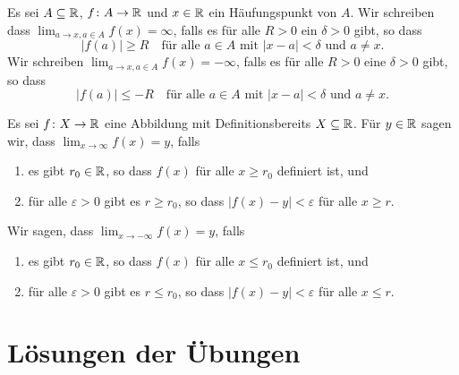 \documentclass[a4paper,10pt]{article}
\begin{document}
\begin{defi}
 Es sei $A \subseteq \mathbb{R}$, $f \colon A \to \mathbb{R}$ und $x \in \mathbb{R}$ ein Häufungspunkt von $A$. Wir schreiben dass $\lim_{a \to x, a \in A} f(x) = \infty$, falls es für alle $R > 0$ ein $\delta > 0$ gibt, so dass
 \[
  |f(a)| \geq R \quad \text{für alle $a \in A$ mit $|x-a| < \delta$ und $a \neq x$}.
 \]
 Wir schreiben $\lim_{a \to x, a \in A} f(x) = -\infty$, falls es für alle $R > 0$ eine $\delta > 0$ gibt, so dass
 \[
  |f(a)| \leq -R \quad \text{für alle $a \in A$ mit $|x-a| < \delta$ und $a \neq x$}.
 \]
\end{defi}




\begin{defi}
 Es sei $f \colon X \to \mathbb{R}$ eine Abbildung mit Definitionsbereits $X \subseteq \mathbb{R}$. Für $y \in \mathbb{R}$ sagen wir, dass $\lim_{x \to \infty} f(x) = y$, falls
 \begin{enumerate}
  \item
   es gibt $r_0 \in \mathbb{R}$, so dass $f(x)$ für alle $x \geq r_0$ definiert ist, und
  \item
   für alle $\varepsilon > 0$ gibt es $r \geq r_0$, so dass $|f(x) - y| < \varepsilon$ für alle $x \geq r$.
 \end{enumerate}
 Wir sagen, dass $\lim_{x \to -\infty} f(x) = y$, falls
 \begin{enumerate}
  \item
   es gibt $r_0 \in \mathbb{R}$, so dass $f(x)$ für alle $x \leq r_0$ definiert ist, und
  \item
   für alle $\varepsilon > 0$ gibt es $r \leq r_0$, so dass $|f(x) - y| < \varepsilon$ für alle $x \leq r$.
 \end{enumerate}
\end{defi}









\newpage


\section{Lösungen der Übungen}


\printsolutions
\end{document}
